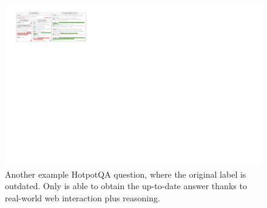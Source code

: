 \begin{figure}[ht]
    \centering
    \includegraphics[width=\textwidth]{iclr2023/figure/date.pdf}
    \caption{
    {
    Another example HotpotQA question, where the original label is outdated. Only \model{} is able to obtain the up-to-date answer thanks to real-world web interaction plus reasoning.}
    }
    \label{fig:date}
    \vspace{-10pt}
\end{figure}

